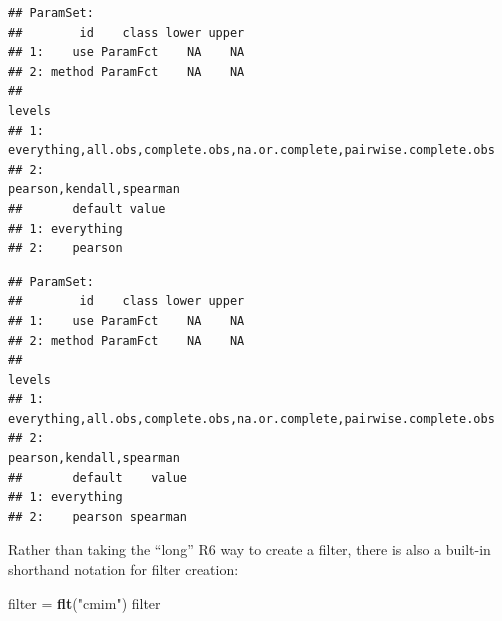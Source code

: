\documentclass[]{article}
\newenvironment{Shaded}{\begin{snugshade}}{\end{snugshade}}
\newcommand{\CommentTok}[1]{\textcolor[rgb]{0.56,0.35,0.01}{\textit{#1}}}
\newcommand{\DataTypeTok}[1]{\textcolor[rgb]{0.13,0.29,0.53}{#1}}
\newcommand{\KeywordTok}[1]{\textcolor[rgb]{0.13,0.29,0.53}{\textbf{#1}}}
\newcommand{\NormalTok}[1]{#1}
\newcommand{\OperatorTok}[1]{\textcolor[rgb]{0.81,0.36,0.00}{\textbf{#1}}}
\newcommand{\StringTok}[1]{\textcolor[rgb]{0.31,0.60,0.02}{#1}}
\renewenvironment{Shaded} {\begin{snugshade}\small} {\end{snugshade}}
\begin{document}
\begin{Shaded}
\end{Shaded}

\begin{verbatim}
## ParamSet: 
##        id    class lower upper
## 1:    use ParamFct    NA    NA
## 2: method ParamFct    NA    NA
##                                                                  levels
## 1: everything,all.obs,complete.obs,na.or.complete,pairwise.complete.obs
## 2:                                             pearson,kendall,spearman
##       default value
## 1: everything      
## 2:    pearson
\end{verbatim}

\begin{Shaded}
\end{Shaded}

\begin{verbatim}
## ParamSet: 
##        id    class lower upper
## 1:    use ParamFct    NA    NA
## 2: method ParamFct    NA    NA
##                                                                  levels
## 1: everything,all.obs,complete.obs,na.or.complete,pairwise.complete.obs
## 2:                                             pearson,kendall,spearman
##       default    value
## 1: everything         
## 2:    pearson spearman
\end{verbatim}

Rather than taking the ``long'' R6 way to create a filter, there is also a built-in shorthand notation for filter creation:

\begin{Shaded}
\begin{Highlighting}[]
\NormalTok{filter =}\StringTok{ }\KeywordTok{flt}\NormalTok{(}\StringTok{"cmim"}\NormalTok{)}
\NormalTok{filter}
\end{Highlighting}
\end{Shaded}
\end{document}
